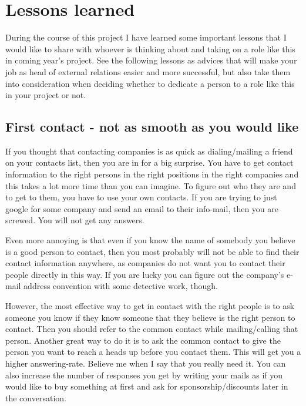 \section{Lessons learned}\label{sec:lessons_learned}
During the course of this project I have learned some important lessons that I would like to share with whoever is thinking about and taking on a role like this in coming year's project. See the following lessons as advices that will make your job as head of external relations easier and more successful, but also take them into consideration when deciding whether to dedicate a person to a role like this in your project or not.

\subsection{First contact - not as smooth as you would like}
If you thought that contacting companies is as quick as dialing/mailing a friend on your contacts list, then you are in for a big surprise. You have to get contact information to the right persons in the right positions in the right companies and this takes a lot more time than you can imagine. To figure out who they are and to get to them, you have to use your own contacts. If you are trying to just google for some company and send an email to their info-mail, then you are screwed. You will not get any answers. 

Even more annoying is that even if you know the name of somebody you believe is a good person to contact, then you most probably will not be able to find their contact information anywhere, as companies do not want you to contact their people directly in this way. If you are lucky you can figure out the company's e-mail address convention with some detective work, though. 

However, the most effective way to get in contact with the right people is to ask someone you know if they know someone that they believe is the right person to contact. Then you should refer to the common contact while mailing/calling that person. Another great way to do it is to ask the common contact to give the person you want to reach a heads up before you contact them. This will get you a higher answering-rate. Believe me when I say that you really need it. You can also increase the number of responses you get by writing your mails as if you would like to buy something at first and ask for sponsorship/discounts later in the conversation. 

